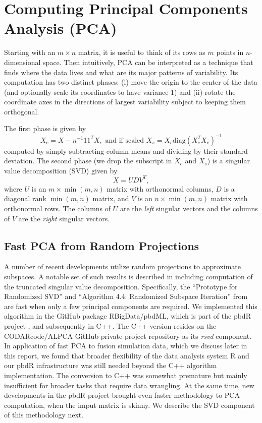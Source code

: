 \section{Computing Principal Components Analysis (PCA)}
\label{sec:pca}
Starting with an $m\times n$ matrix, it is useful to think of its rows
as $m$ points in $n$-dimensional space. Then intuitively, PCA can be
interpreted as a technique that finds where the data lives and what
are its major patterns of variability.  Its computation has two
distinct phases: (i) move the origin to the center of the data (and
optionally scale its coordinates to have variance 1) and (ii) rotate
the coordinate axes in the directions of largest variability subject
to keeping them orthogonal.

The first phase is given by
\begin{displaymath}
  X_c = X - n^{-1}11^TX, \mbox{ and if scaled }
  X_s = X_c \mbox{diag}(X_c^TX_c)^{-1}
\end{displaymath}
computed by simply subtracting column means and dividing by their
standard deviation. The second phase (we drop the subscript in $X_c$
and $X_s$) is a singular value decomposition (SVD) given by
\begin{equation}
  X = U D V^T,
  \label{eq:svd}
\end{equation}
where $U$ is an $m \times \min(m,n)$ matrix with orthonormal columns,
$D$ is a diagonal rank $\min(m,n)$ matrix, and $V$ is an
$n\times\min(m,n)$ matrix with orthonormal rows. The columns of $U$
are the {\it left} singular vectors and the columns of $V$ are the
{\it right} singular vectors.

\subsection{Fast PCA from Random Projections}

A number of recent developments utilize random projections to
approximate subspaces. A notable set of such results is described in
\cite{Halko2011} including computation of the truncated singular value
decomposition. Specifically, the ``Prototype for Randomized SVD'' and
``Algorithm 4.4: Randomized Subspace Iteration'' from \cite{Halko2011}
are fast when only a few principal components are required. We
implemented this algorithm in the GitHub package RBigData/pbdML, which
is part of the pbdR project \cite{Schmidt2017}, and subsequently in
C++. The C++ version resides on the CODARcode/ALPCA GitHub private
project repository as its {\it rsvd} component. In application of fast
PCA to fusion simulation data, which we discuss later in this report,
we found that broader flexibility of the data analysis system R and
our pbdR infrastructure was still needed beyond the C++ algorithm
implementation. The conversion to C++ was somewhat premature but
mainly insufficient for broader tasks that require data wrangling. At
the same time, new developments in the pbdR project brought even
faster methodology to PCA computation, when the imput matrix is
skinny. We describe the SVD component of this methodology next.

